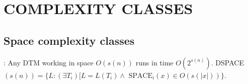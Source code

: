 \section{COMPLEXITY CLASSES}
\subsection{Space complexity classes}
\bit
\w {}: Any DTM working in space $O(s(n))$ runs in time $O(2^{s(n)})$. 
\w DSPACE$(s(n)) = \{L: (\exists T_i)[L = L(T_i) \wedge \mbox{\ SPACE}_i(x)
  \in O(s(|x|))\}$.
\w 
\eit